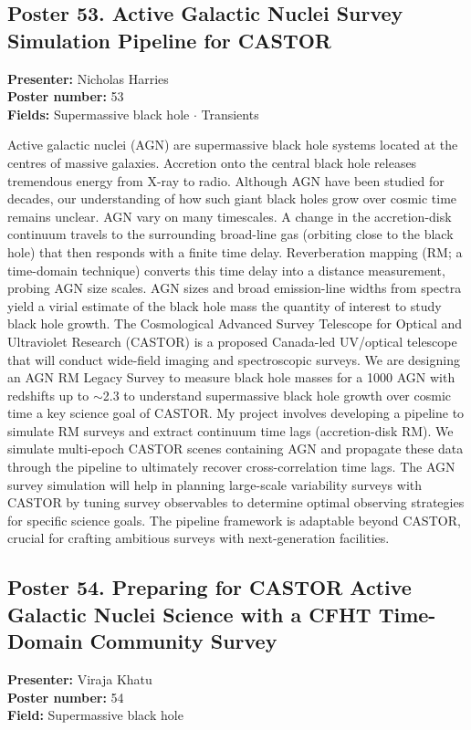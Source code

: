 \hypertarget{poster-abstract-talk-282}{}\label{poster-abstract-page-talk-282}
\subsection*{Poster 53. Active Galactic Nuclei Survey Simulation Pipeline for CASTOR}
\textbf{Presenter:} Nicholas Harries\\
\textbf{Poster number:} 53\\
\textbf{Fields:} Supermassive black hole $\cdot$ Transients

Active galactic nuclei (AGN) are supermassive black hole systems located at the centres of massive galaxies. Accretion onto the central black hole releases tremendous energy from X-ray to radio. Although AGN have been studied for decades, our understanding of how such giant black holes grow over cosmic time remains unclear. AGN vary on many timescales. A change in the accretion-disk continuum travels to the surrounding broad-line gas (orbiting close to the black hole) that then responds with a finite time delay. Reverberation mapping (RM; a time-domain technique) converts this time delay into a distance measurement, probing AGN size scales. AGN sizes and broad emission-line widths from spectra yield a virial estimate of the black hole mass the quantity of interest to study black hole growth. The Cosmological Advanced Survey Telescope for Optical and Ultraviolet Research (CASTOR) is a proposed Canada-led UV/optical telescope that will conduct wide-field imaging and spectroscopic surveys. We are designing an AGN RM Legacy Survey to measure black hole masses for a 1000 AGN with redshifts up to $\sim$2.3 to understand supermassive black hole growth over cosmic time a key science goal of CASTOR. My project involves developing a pipeline to simulate RM surveys and extract continuum time lags (accretion-disk RM). We simulate multi-epoch CASTOR scenes containing AGN and propagate these data through the pipeline to ultimately recover cross-correlation time lags. The AGN survey simulation will help in planning large-scale variability surveys with CASTOR by tuning survey observables to determine optimal observing strategies for specific science goals. The pipeline framework is adaptable beyond CASTOR, crucial for crafting ambitious surveys with next-generation facilities.

\hypertarget{poster-abstract-talk-295}{}\label{poster-abstract-page-talk-295}
\subsection*{Poster 54. Preparing for CASTOR Active Galactic Nuclei Science with a CFHT Time-Domain Community Survey}
\textbf{Presenter:} Viraja Khatu\\
\textbf{Poster number:} 54\\
\textbf{Field:} Supermassive black hole

